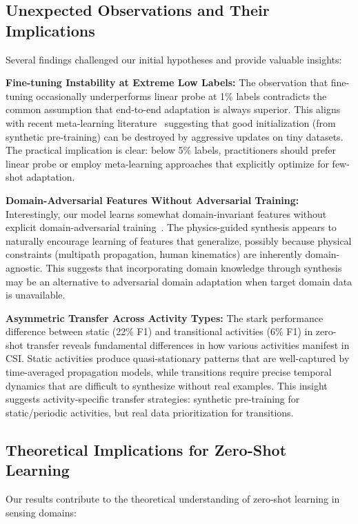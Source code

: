 \documentclass[journal]{IEEEtran}
\begin{document}
\subsection{Unexpected Observations and Their Implications}

Several findings challenged our initial hypotheses and provide valuable insights:

\textbf{Fine-tuning Instability at Extreme Low Labels:} The observation that fine-tuning occasionally underperforms linear probe at 1\% labels contradicts the common assumption that end-to-end adaptation is always superior. This aligns with recent meta-learning literature~\cite{finn2017maml} suggesting that good initialization (from synthetic pre-training) can be destroyed by aggressive updates on tiny datasets. The practical implication is clear: below 5\% labels, practitioners should prefer linear probe or employ meta-learning approaches that explicitly optimize for few-shot adaptation.

\textbf{Domain-Adversarial Features Without Adversarial Training:} Interestingly, our model learns somewhat domain-invariant features without explicit domain-adversarial training~\cite{ganin2015unsupervised}. The physics-guided synthesis appears to naturally encourage learning of features that generalize, possibly because physical constraints (multipath propagation, human kinematics) are inherently domain-agnostic. This suggests that incorporating domain knowledge through synthesis may be an alternative to adversarial domain adaptation when target domain data is unavailable.

\textbf{Asymmetric Transfer Across Activity Types:} The stark performance difference between static (22\% F1) and transitional activities (6\% F1) in zero-shot transfer reveals fundamental differences in how various activities manifest in CSI. Static activities produce quasi-stationary patterns that are well-captured by time-averaged propagation models, while transitions require precise temporal dynamics that are difficult to synthesize without real examples. This insight suggests activity-specific transfer strategies: synthetic pre-training for static/periodic activities, but real data prioritization for transitions.

\subsection{Theoretical Implications for Zero-Shot Learning}

Our results contribute to the theoretical understanding of zero-shot learning in sensing domains:
\end{document}
